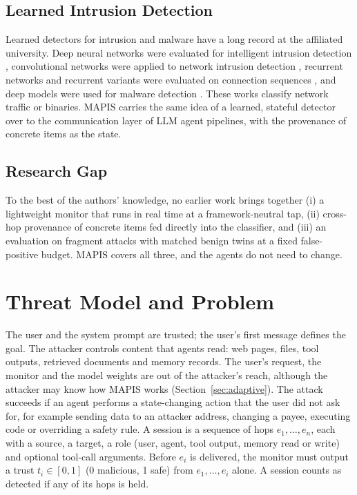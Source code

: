 \documentclass{ieeeaccess}
\begin{document}
\subsection{Learned Intrusion Detection}
Learned detectors for intrusion and malware have a long record at the affiliated university. Deep neural networks were evaluated for intelligent intrusion detection \cite{vinayakumar2019ids}, convolutional networks were applied to network intrusion detection \cite{vinayakumar2017cnn}, recurrent networks and recurrent variants were evaluated on connection sequences \cite{vinayakumar2017rnn}, and deep models were used for malware detection \cite{vinayakumar2019malware}. These works classify network traffic or binaries. MAPIS carries the same idea of a learned, stateful detector over to the communication layer of LLM agent pipelines, with the provenance of concrete items as the state.

\subsection{Research Gap}
To the best of the authors' knowledge, no earlier work brings together (i) a lightweight monitor that runs in real time at a framework-neutral tap, (ii) cross-hop provenance of concrete items fed directly into the classifier, and (iii) an evaluation on fragment attacks with matched benign twins at a fixed false-positive budget. MAPIS covers all three, and the agents do not need to change.

\section{Threat Model and Problem}
\label{sec:threat}
The user and the system prompt are trusted; the user's first message defines the goal. The attacker controls content that agents read: web pages, files, tool outputs, retrieved documents and memory records. The user's request, the monitor and the model weights are out of the attacker's reach, although the attacker may know how MAPIS works (Section~\ref{sec:adaptive}). The attack succeeds if an agent performs a state-changing action that the user did not ask for, for example sending data to an attacker address, changing a payee, executing code or overriding a safety rule. A session is a sequence of hops $e_1,\dots,e_n$, each with a source, a target, a role (user, agent, tool output, memory read or write) and optional tool-call arguments. Before $e_i$ is delivered, the monitor must output a trust $t_i\in[0,1]$ (0 malicious, 1 safe) from $e_1,\dots,e_i$ alone. A session counts as detected if any of its hops is held.
\end{document}
